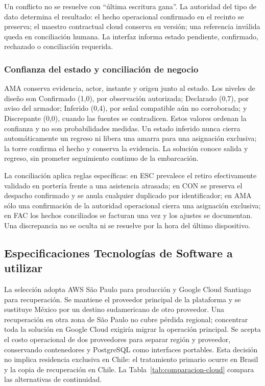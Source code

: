 \documentclass[11pt,letterpaper]{report}
\begin{document}
Un conflicto no se resuelve con ``última escritura gana''. La autoridad del tipo de dato determina el resultado: el hecho operacional confirmado en el recinto se preserva; el maestro contractual cloud conserva su versión; una referencia inválida queda en conciliación humana. La interfaz informa estado pendiente, confirmado, rechazado o conciliación requerida.

\subsubsection*{Confianza del estado y conciliación de negocio}

AMA conserva evidencia, actor, instante y origen junto al estado. Los niveles de diseño son Confirmado (1,0), por observación autorizada; Declarado (0,7), por aviso del armador; Inferido (0,4), por señal compatible aún no corroborada; y Discrepante (0,0), cuando las fuentes se contradicen. Estos valores ordenan la confianza y no son probabilidades medidas. Un estado inferido nunca cierra automáticamente un regreso ni libera una amarra para una asignación exclusiva; la torre confirma el hecho y conserva la evidencia. La solución conoce salida y regreso, sin prometer seguimiento continuo de la embarcación.

La conciliación aplica reglas específicas: en ESC prevalece el retiro efectivamente validado en portería frente a una asistencia atrasada; en CON se preserva el despacho confirmado y se anula cualquier duplicado por identificador; en AMA sólo una confirmación de la autoridad operacional cierra una asignación exclusiva; en FAC los hechos conciliados se facturan una vez y los ajustes se documentan. Una discrepancia no se oculta ni se resuelve por la hora del último dispositivo.

\subsection{Especificaciones Tecnologías de Software a utilizar}

La selección adopta AWS São Paulo para producción y Google Cloud Santiago para recuperación. Se mantiene el proveedor principal de la plataforma y se sustituye México por un destino sudamericano de otro proveedor. Una recuperación en otra zona de São Paulo no cubre pérdida regional; concentrar toda la solución en Google Cloud exigiría migrar la operación principal. Se acepta el costo operacional de dos proveedores para separar región y proveedor, conservando contenedores y PostgreSQL como interfaces portables. Esta decisión no implica residencia exclusiva en Chile: el tratamiento primario ocurre en Brasil y la copia de recuperación en Chile. La Tabla~\ref{tab:comparacion-cloud} compara las alternativas de continuidad.
\end{document}
